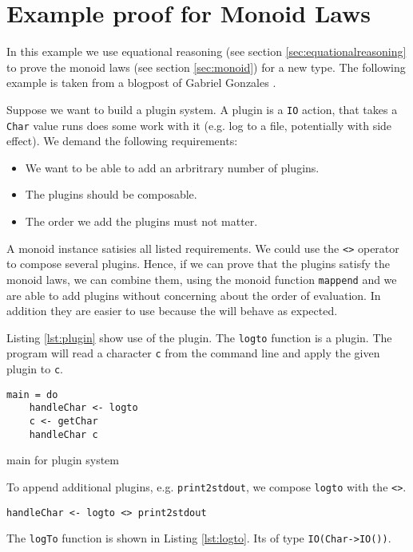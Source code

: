 \section{Example proof for Monoid Laws}
\label{sec:example}
In this example we use equational reasoning (see section \ref{sec:equationalreasoning} to prove the monoid laws (see section \ref{sec:monoid}) for a new type.
The following example is taken from a blogpost of Gabriel Gonzales \cite{gonzales14}. 

Suppose we want to build a plugin system. A plugin is a \verb|IO| action, that takes a \verb|Char| value runs does some work with it (e.g. log to a file, potentially with side effect). We demand the following requirements:
\begin{itemize}
\item We want to be able to add an arbritrary number of plugins.
\item The plugins should be composable.
\item The order we add the plugins must not matter.
\end{itemize}

A monoid instance satisies all listed requirements. We could use the \verb|<>| operator to compose several plugins. Hence,  if we can prove that the plugins satisfy the monoid laws, we can combine them, using the monoid function \verb|mappend| and we are able to add plugins without concerning about the order of evaluation. In addition they are easier to use because the will behave as expected.

Listing \ref{lst:plugin} show use of the plugin. The \verb|logto| function is a plugin. The program will read a character \verb|c| from the command line and apply the given plugin to \verb|c|.

\begin{program}
\begin{verbatim}
main = do
    handleChar <- logto
    c <- getChar
    handleChar c
\end{verbatim}
\label{lst:plugin}
\caption{main for plugin system}
\end{program}

To append additional plugins, e.g. \verb|print2stdout|, we compose \verb|logto| with the \verb|<>|.
\begin{verbatim}
handleChar <- logto <> print2stdout
\end{verbatim}
The \verb|logTo| function is shown in Listing \ref{lst:logto}. Its of type \verb|IO(Char->IO())|. 

